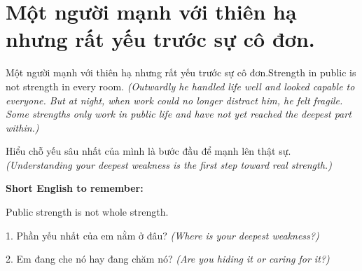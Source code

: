 \section{Một người mạnh với thiên hạ nhưng rất yếu trước sự cô đơn.}
\begin{truyen}{Một người mạnh với thiên hạ nhưng rất yếu trước sự cô đơn.}{Strength in public is not strength in every room.}
\textit{(Outwardly he handled life well and looked capable to everyone. But at night, when work could no longer distract him, he felt fragile. Some strengths only work in public life and have not yet reached the deepest part within.)}
\end{truyen}
\begin{baihoc}
Hiểu chỗ yếu sâu nhất của mình là bước đầu để mạnh lên thật sự.
\textit{(Understanding your deepest weakness is the first step toward real strength.)}
\end{baihoc}
\begin{ghinhoanh}
\textbf{Short English to remember:}

Public strength is not whole strength.
\end{ghinhoanh}
\begin{tuhocnhanh}
1. Phần yếu nhất của em nằm ở đâu? \textit{(Where is your deepest weakness?)}

2. Em đang che nó hay đang chăm nó? \textit{(Are you hiding it or caring for it?)}
\end{tuhocnhanh}
\ngancach